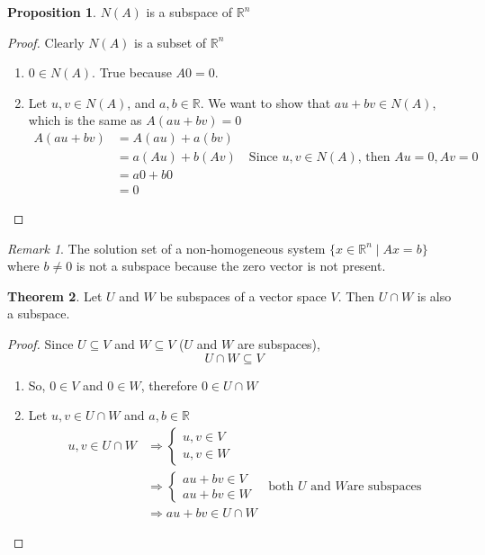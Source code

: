 \documentclass{report}
\theoremstyle{definition}
\newtheorem{_thm}{Theorem}[section]
\newtheorem{_prop}[_thm]{Proposition}
\theoremstyle{remark}
\newtheorem{_rem}{Remark}[section]
\begin{document}
\begin{_prop}
$N(A)$ is a subspace of $\mathbb{R}^n$
\end{_prop}
\begin{proof}
Clearly $N(A)$ is a subset of $\mathbb{R}^n$
\begin{enumerate}[i]
 \item $0\in N(A)$. True because $A0=0$.
 \item Let $u,v\in N(A)$, and $a,b\in \mathbb{R}$.
 We want to show that $au+bv\in N(A)$, which is the same as $A(au+bv)=0$
 \begin{align*}
 A(au+bv) &= A(au)+a(bv) \\
 &= a(Au)+b(Av) \quad \text{Since } u,v\in N(A) \text{, then } Au=0, Av=0 \\
 &= a0+b0 \\
 &= 0
 \end{align*}
\end{enumerate}
\end{proof}

\begin{_rem}
The solution set of a non-homogeneous system $\{x\in \mathbb{R}^n \mid Ax=b\}$ where $b\neq 0$ is not a subspace because the zero vector is not present.
\end{_rem}

\begin{_thm}
Let $U$ and $W$ be subspaces of a vector space $V$.
Then $U\cap W$ is also a subspace.
\end{_thm}

\begin{proof}
Since $U\subseteq V$ and $W\subseteq V$ ($U$ and $W$ are subspaces),
\[U\cap W\subseteq V\]
\begin{enumerate}[i]
 \item So, $0\in V$ and $0\in W$, therefore $0\in U\cap W$
 \item Let $u,v\in U\cap W$ and $a,b\in \mathbb{R}$
 \begin{align*}
  u,v\in U\cap W &\Rightarrow \left\{ 
  \begin{array}{l}
    u,v\in V \\
    u,v\in W
  \end{array} \right. \\
  &\Rightarrow \left\{ 
  \begin{array}{l}
    au+bv\in V \\
    au+bv\in W
  \end{array} \right. \quad \text{both } U \text{ and } W \text{are subspaces} \\
  &\Rightarrow au+bv\in U \cap W
 \end{align*}
\end{enumerate}
\end{proof}
\end{document}
